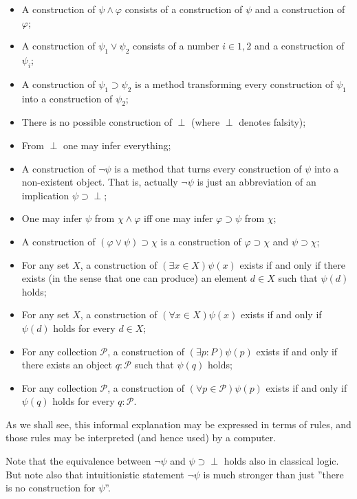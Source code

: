 \begin{itemize}
\item A construction of $\psi\wedge\varphi$ consists of a construction of $\psi$
  and a construction of $\varphi$;
\item A construction of $\psi_{1} \vee \psi_{2}$ consists of a number
  $i \in {1, 2}$ and a construction of $\psi_{i}$;
\item A construction of $\psi_{1} \supset \psi_{2}$ is a method transforming
  every construction of $\psi_{1}$ into a construction of $\psi_{2}$;
\item There is no possible construction of $\perp$ (where $\perp$ denotes
  falsity);
\item From $\perp$ one may infer everything;
\item A construction of $\neg\psi$ is a method that turns every construction of
  $\psi$ into a non-existent object. That is, actually $\neg\psi$ is just an
  abbreviation of an implication $\psi \supset \perp$;
\item One may infer $\psi$ from $\chi\wedge\varphi$ iff one may infer
  $\varphi \supset \psi$ from $\chi$;
\item A construction of $(\varphi \vee \psi) \supset \chi$ is a construction of
  $\varphi \supset \chi$ and $\psi \supset \chi$;
\item For any set $X$, a construction of $(\exists x \in X)\psi(x)$ exists if
  and only if there exists (in the sense that one can produce) an element
  $d \in X$ such that $\psi(d)$ holds;
\item For any set $X$, a construction of $(\forall x \in X)\psi(x)$ exists if
  and only if $\psi(d)$ holds for every $d \in X$;
\item For any collection $\mathcal{P}$, a construction of
  $(\exists p : P)\psi(p)$ exists if and only if there exists an object
  $q : \mathcal{P}$ such that $\psi(q)$ holds;
\item For any collection $\mathcal{P}$, a construction of
  $(\forall p \in \mathcal{P})\psi(p)$ exists if and only if $\psi(q)$ holds for
  every $q : \mathcal{P}$.
\end{itemize}

As we shall see, this informal explanation may be expressed in terms of rules,
and those rules may be interpreted (and hence used) by a computer.

Note that the equivalence between $\neg\psi$ and $\psi\supset\perp$ holds also
in classical logic. But note also that intuitionistic statement $\neg\psi$
is much stronger than just ''there is no construction for $\psi$''.

